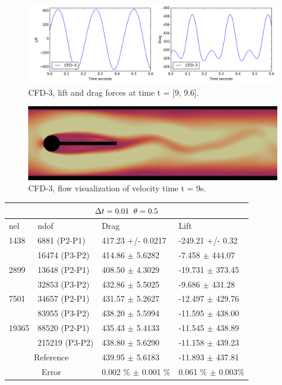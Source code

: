 \begin{figure}[h!]
  \centering
    \includegraphics[scale=0.5]{./Fig/cfd3_liftdrag.png}
      \caption{CFD-3, lift and drag forces at time t = [9, 9.6].}
\end{figure}

\begin{figure}[h!]
  \centering
    \includegraphics[scale=0.2]{./Fig/cfd3.png}
      \caption{CFD-3, flow visualization of velocity time t = 9s.}
\end{figure}

\newpage

\begin{table}[h!]
\centering
\label{CFD-3 Results}
\begin{tabular}{ |p{1cm}||p{2.9cm}|p{3.3cm}|p{3.3cm}|}
 \hline
  \multicolumn{4}{|c|}{$\Delta t = 0.01 \hspace{2mm} \theta = 0.5$} \\
   \hline
nel & ndof & Drag  & Lift \\
\hline
 1438    & 6881  (P2-P1)   & 417.23       +/-  0.0217 & -249.21       +/-  0.32  \\
   & 16474 (P3-P2)   & 414.86      $\pm$  5.6282 & -7.458      $\pm$  444.07  \\
 \hline
 2899    & 13648  (P2-P1) & 408.50  $\pm$   4.3029 & -19.731  $\pm$   373.45 \\  
     &  32853 (P3-P2)  & 432.86      $\pm$  5.5025 & -9.686      $\pm$  431.28  \\
  \hline
  7501    & 34657 (P2-P1) & 431.57  $\pm$   5.2627 & -12.497  $\pm$   429.76 \\    
    &  83955 (P3-P2)  & 438.20      $\pm$  5.5994 & -11.595      $\pm$  438.00 \\
    \hline
    19365   & 88520 (P2-P1) & 435.43  $\pm$   5.4133 & -11.545  $\pm$   438.89 \\
   &   215219 (P3-P2) & 438.80      $\pm$  5.6290 & -11.158      $\pm$  439.23 \\
\hline
 \multicolumn{2}{|c|}{Reference}  & 439.95 $\pm$ 5.6183 & -11.893 $\pm$ 437.81\\
 \hline
  \multicolumn{2}{|c|}{Error}  & 0.002 \% $\pm$ 0.001 \% & 0.061 \% $\pm$ 0.003\% \\
  \hline
  \end{tabular}
\end{table}

